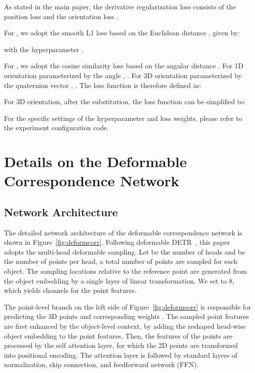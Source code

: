 \documentclass[10pt,twocolumn,letterpaper]{article}
\begin{document}
As stated in the main paper, the derivative regularization loss  consists of the position loss  and the orientation loss . 

For , we adopt the smooth L1 loss based on the Euclidean distance , given by:

with the hyperparameter .

For , we adopt the cosine similarity loss based on the angular distance . For 1D orientation parameterized by the angle , . For 3D orientation parameterized by the quaternion vector , . The loss function is therefore defined as:

For 3D orientation, after the substitution, the loss function can be simplified to:


For the specific settings of the hyperparameter  and loss weights, please refer to the experiment configuration code.

\section{Details on the Deformable Correspondence Network}

\subsection{Network Architecture} \label{deformnetsup}
The detailed network architecture of the deformable correspondence network is shown in Figure~\ref{fig:deformcorr}.
Following deformable DETR~\cite{deformabledetr}, this paper adopts the multi-head deformable sampling. Let  be the number of heads and  be the number of points per head, a total number of  points are sampled for each object. The sampling locations relative to the reference point are generated from the object embedding by a single layer of linear transformation. We set  to 8, which yields  channels for the point features.

The point-level branch on the left side of Figure~\ref{fig:deformcorr} is responsible for predicting the 3D points  and corresponding weights . The sampled point features are first enhanced by the object-level context, by adding the reshaped head-wise object embedding to the point features. Then, the features of the  points are processed by the self attention layer, for which the 2D points are transformed into positional encoding. The attention layer is followed by standard layers of normalization, skip connection, and feedforward network (FFN).
\end{document}
